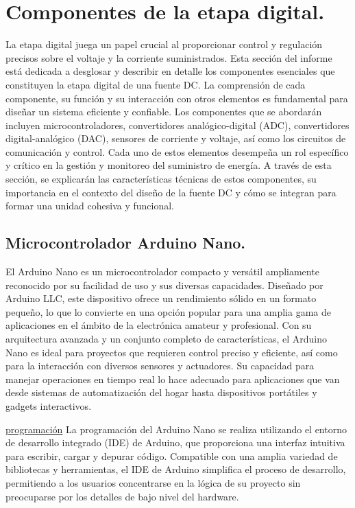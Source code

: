 \section{Componentes de la etapa digital.}
La etapa digital juega un papel crucial al proporcionar control y regulación precisos sobre el voltaje y la corriente suministrados. Esta sección del informe está dedicada a desglosar y describir en detalle los componentes esenciales que constituyen la etapa digital de una fuente DC. La comprensión de cada componente, su función y su interacción con otros elementos es fundamental para diseñar un sistema eficiente y confiable.
Los componentes que se abordarán incluyen microcontroladores, convertidores analógico-digital (ADC), convertidores digital-analógico (DAC), sensores de corriente y voltaje, así como los circuitos de comunicación y control. Cada uno de estos elementos desempeña un rol específico y crítico en la gestión y monitoreo del suministro de energía. A través de esta sección, se explicarán las características técnicas de estos componentes, su importancia en el contexto del diseño de la fuente DC y cómo se integran para formar una unidad cohesiva y funcional.

\subsection{Microcontrolador Arduino Nano.}
El Arduino Nano es un microcontrolador compacto y versátil ampliamente reconocido por su facilidad de uso y sus diversas capacidades. Diseñado por Arduino LLC, este dispositivo ofrece un rendimiento sólido en un formato pequeño, lo que lo convierte en una opción popular para una amplia gama de aplicaciones en el ámbito de la electrónica amateur y profesional.
Con su arquitectura avanzada y un conjunto completo de características, el Arduino Nano es ideal para proyectos que requieren control preciso y eficiente, así como para la interacción con diversos sensores y actuadores. Su capacidad para manejar operaciones en tiempo real lo hace adecuado para aplicaciones que van desde sistemas de automatización del hogar hasta dispositivos portátiles y gadgets interactivos.

\underline{programación}
La programación del Arduino Nano se realiza utilizando el entorno de desarrollo integrado (IDE) de Arduino, que proporciona una interfaz intuitiva para escribir, cargar y depurar código. Compatible con una amplia variedad de bibliotecas y herramientas, el IDE de Arduino simplifica el proceso de desarrollo, permitiendo a los usuarios concentrarse en la lógica de su proyecto sin preocuparse por los detalles de bajo nivel del hardware.

